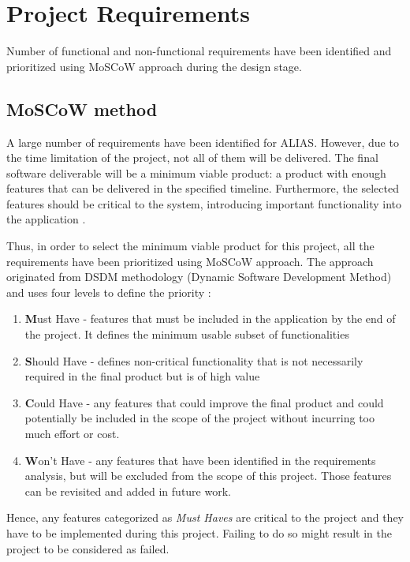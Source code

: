\section{Project Requirements} \label{label:projectRequirements}
Number of functional and non-functional requirements have been identified and prioritized using MoSCoW approach during the design stage. 

\subsection{MoSCoW method}
A large number of requirements have been identified for ALIAS. However, due to the time limitation of the project, not all of them will be delivered. The final software deliverable will be a minimum viable product: a product with enough features that can be delivered in the specified timeline. Furthermore, the selected features should be critical to the system, introducing important functionality into the application \citep{mvp}.

Thus, in order to select the minimum viable product for this project, all the requirements have been prioritized using MoSCoW approach. The approach originated from DSDM methodology (Dynamic Software Development Method) and uses four levels to define the priority \citep{moscow}:

\begin{enumerate}
	\item \textbf{M}ust Have - features that must be included in the application by the end of the project. It defines the minimum usable subset of functionalities 
	\item \textbf{S}hould Have - defines non-critical functionality that is not necessarily required in the final product but is of high value
	\item \textbf{C}ould Have - any features that could improve the final product and could potentially be included in the scope of the project without incurring too much effort or cost.
	\item \textbf{W}on't Have - any features that have been identified in the requirements analysis, but will be excluded from the scope of this project. Those features can be revisited and added in future work.
\end{enumerate}

Hence, any features categorized as \textit{Must Haves} are critical to the project and they have to be implemented during this project. Failing to do so might result in the project to be considered as failed. 

